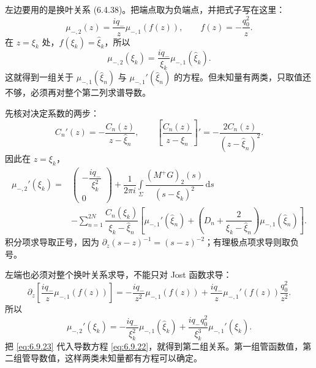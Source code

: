 \documentclass[lang=cn,scheme=chinese,mode=simple,device=normal,color=blue,math=cm,thmcnt=section,12pt]{elegantbook}
\newcommand{\dd}{\,\mathrm{d}}
\newcommand{\eqq}[2]{\tag{#1}\label{eq:#1}#2}
\begin{document}
左边要用的是换叶关系 (6.4.38)。把端点取为负端点，并把式子写在这里：
\[
\mu_{-,2}(z)=\dfrac{iq_-}{z}\mu_{-,1}(f(z)),\qquad
f(z)=-\dfrac{q_0^2}{z}.
\]
在 $z=\xi_k$ 处，$f(\xi_k)=\widehat\xi_k$，所以
\[
\mu_{-,2}(\xi_k)=\dfrac{iq_-}{\xi_k}\mu_{-,1}(\widehat\xi_k).
\]
这就得到一组关于 $\mu_{-,1}(\widehat\xi_n)$ 与 $\mu_{-,1}'(\widehat\xi_n)$ 的方程。但未知量有两类，只取值还不够，必须再对整个第二列求谱导数。

先核对决定系数的两步：
\[
C_n'(z)=-\dfrac{C_n(z)}{z-\widehat\xi_n},\qquad
\left[\dfrac{C_n(z)}{z-\widehat\xi_n}\right]'
=-\dfrac{2C_n(z)}{(z-\widehat\xi_n)^2}.
\]
因此在 $z=\xi_k$，
\begin{equation}\eqq{6.9.22}{
\begin{aligned}
\mu_{-,2}'(\xi_k)={}&
\begin{pmatrix}-\dfrac{iq_-}{\xi_k^2}\\0\end{pmatrix}
+\dfrac{1}{2\pi i}\int\limits_\Sigma
\dfrac{(M^+G)_2(s)}{(s-\xi_k)^2}\dd s\\
&-\sum\limits_{n=1}^{2N}
\dfrac{C_n(\xi_k)}{\xi_k-\widehat\xi_n}
\left[\mu_{-,1}'(\widehat\xi_n)
+\left(D_n+\dfrac{2}{\xi_k-\widehat\xi_n}\right)\mu_{-,1}(\widehat\xi_n)\right].
\end{aligned}}\end{equation}
积分项求导取正号，因为 $\partial_z(s-z)^{-1}=(s-z)^{-2}$；有理极点项求导则取负号。

左端也必须对整个换叶关系求导，不能只对 Jost 函数求导：
\[
\partial_z\left[\dfrac{iq_-}{z}\mu_{-,1}(f(z))\right]
=-\dfrac{iq_-}{z^2}\mu_{-,1}(f(z))
+\dfrac{iq_-}{z}\mu_{-,1}'(f(z))\dfrac{q_0^2}{z^2}.
\]
所以
\begin{equation}\eqq{6.9.23}{\mu_{-,2}'(\xi_k)
=-\dfrac{iq_-}{\xi_k^2}\mu_{-,1}(\widehat\xi_k)
+\dfrac{iq_-q_0^2}{\xi_k^3}\mu_{-,1}'(\widehat\xi_k).}\end{equation}
把 \eqref{eq:6.9.23} 代入导数方程 \eqref{eq:6.9.22}，就得到第二组关系。第一组管函数值，第二组管导数值，这样两类未知量都有方程可以确定。
\end{document}
